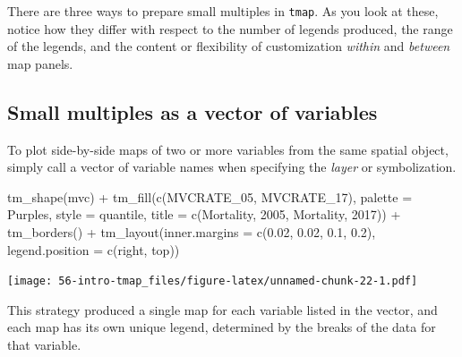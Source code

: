 \documentclass[
]{book}
\newenvironment{Shaded}{\begin{snugshade}}{\end{snugshade}}
\newcommand{\AttributeTok}[1]{\textcolor[rgb]{0.77,0.63,0.00}{#1}}
\newcommand{\FloatTok}[1]{\textcolor[rgb]{0.00,0.00,0.81}{#1}}
\newcommand{\FunctionTok}[1]{\textcolor[rgb]{0.00,0.00,0.00}{#1}}
\newcommand{\NormalTok}[1]{#1}
\newcommand{\SpecialCharTok}[1]{\textcolor[rgb]{0.00,0.00,0.00}{#1}}
\newcommand{\StringTok}[1]{\textcolor[rgb]{0.31,0.60,0.02}{#1}}
\newenvironment{rmdnote}[1]
  {
  \begin{itemize}
  \renewcommand{\labelitemi}{
    \raisebox{-.7\height}[0pt][0pt]{
      {\setkeys{Gin}{width=3em,keepaspectratio}\texttt{[image: images/\#1]}}
    }
  }
  \setlength{\fboxsep}{1em}
  \begin{note}
  \item
  }
  {
  \end{note}
  \end{itemize}
  }
\begin{document}
There are three ways to prepare small multiples in \texttt{tmap}. As you look at these, notice how they differ with respect to the number of legends produced, the range of the legends, and the content or flexibility of customization \emph{within} and \emph{between} map panels.

\hypertarget{small-multiples-as-a-vector-of-variables}{%
\subsection{Small multiples as a vector of variables}\label{small-multiples-as-a-vector-of-variables}}

To plot side-by-side maps of two or more variables from the same spatial object, simply call a vector of variable names when specifying the \emph{layer} or symbolization.

\begin{Shaded}
\begin{Highlighting}[]
\FunctionTok{tm\_shape}\NormalTok{(mvc) }\SpecialCharTok{+} 
  \FunctionTok{tm\_fill}\NormalTok{(}\FunctionTok{c}\NormalTok{(}\StringTok{\textquotesingle{}MVCRATE\_05\textquotesingle{}}\NormalTok{, }\StringTok{\textquotesingle{}MVCRATE\_17\textquotesingle{}}\NormalTok{),}
          \AttributeTok{palette =} \StringTok{\textquotesingle{}Purples\textquotesingle{}}\NormalTok{,}
          \AttributeTok{style =} \StringTok{\textquotesingle{}quantile\textquotesingle{}}\NormalTok{,}
          \AttributeTok{title =} \FunctionTok{c}\NormalTok{(}\StringTok{\textquotesingle{}Mortality, 2005\textquotesingle{}}\NormalTok{, }\StringTok{\textquotesingle{}Mortality, 2017\textquotesingle{}}\NormalTok{)) }\SpecialCharTok{+}
  \FunctionTok{tm\_borders}\NormalTok{() }\SpecialCharTok{+}
  \FunctionTok{tm\_layout}\NormalTok{(}\AttributeTok{inner.margins =} \FunctionTok{c}\NormalTok{(}\FloatTok{0.02}\NormalTok{, }\FloatTok{0.02}\NormalTok{, }\FloatTok{0.1}\NormalTok{, }\FloatTok{0.2}\NormalTok{),}
            \AttributeTok{legend.position =} \FunctionTok{c}\NormalTok{(}\StringTok{\textquotesingle{}right\textquotesingle{}}\NormalTok{, }\StringTok{\textquotesingle{}top\textquotesingle{}}\NormalTok{))}
\end{Highlighting}
\end{Shaded}

\texttt{[image: 56-intro-tmap\_files/figure-latex/unnamed-chunk-22-1.pdf]}

\begin{rmdnote}{note}
This strategy produced a single map for each variable listed in the vector, and each map has its own unique legend, determined by the breaks of the data for that variable.

\end{rmdnote}
\end{document}
